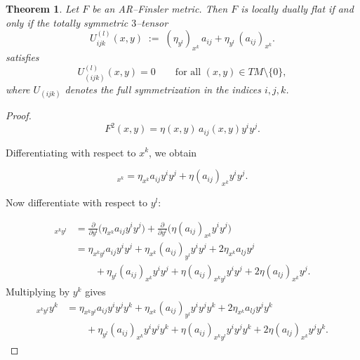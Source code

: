 \documentclass[12pt]{article}
\newtheorem{theorem}{Theorem}[section]
\theoremstyle{definition}
\begin{document}
					
					\begin{theorem}\label{thm:dually-flat-AR-equivalence}
						Let $F$ be an AR--Finsler metric.
						Then $F$ is locally dually flat if and
						only if the totally symmetric $3$--tensor
						\begin{equation}
						U^{(l)}_{ijk}(x,y) \;:=\; (\eta_{y^l})_{x^k}\,a_{ij} + \eta_{y^l}\,(a_{ij})_{x^k}.
						\end{equation}
						satisfies
						\begin{equation}
						U^{(l)}_{(ijk)}(x,y) = 0
						\qquad\text{for all }(x,y)\in TM\setminus\{0\},
						\end{equation}
						where $U_{(ijk)}$ denotes the full symmetrization in the indices $i,j,k$.
					\end{theorem}
					\begin{proof} 
						\begin{equation}
						F^2(x,y)=
						\eta(x,y)\,a_{ij}(x,y)y^iy^j.   
						\end{equation}
						
						Differentiating with respect to $x^k$, we obtain
						
						\begin{equation}
						[F^2]_{x^k}
						=
						\eta_{x^k}a_{ij}y^iy^j
						+
						\eta(a_{ij})_{x^k}y^iy^j.
						\end{equation}
						
						Now differentiate with respect to $y^l$:
						
						\begin{align}
							[F^2]_{x^ky^l}
							&=
							\frac{\partial}{\partial y^l}
							\Big(
							\eta_{x^k}a_{ij}y^iy^j
							\Big)
							+
							\frac{\partial}{\partial y^l}
							\Big(
							\eta(a_{ij})_{x^k}y^iy^j
							\Big)
							\nonumber\\
							&=
							\eta_{x^ky^l}a_{ij}y^iy^j
							+
							\eta_{x^k}(a_{ij})_{y^l}y^iy^j
							+
							2\eta_{x^k}a_{lj}y^j
							\nonumber\\
							&\qquad
							+
							\eta_{y^l}(a_{ij})_{x^k}y^iy^j
							+
							\eta(a_{ij})_{x^ky^l}y^iy^j
							+
							2\eta(a_{lj})_{x^k}y^j.
						\end{align}
						Multiplying by $y^k$ gives
						\begin{align}
							[F^2]_{x^ky^l}y^k
							&=
							\eta_{x^ky^l}a_{ij}y^iy^jy^k
							+
							\eta_{x^k}(a_{ij})_{y^l}y^iy^jy^k
							+
							2\eta_{x^k}a_{lj}y^jy^k
							\nonumber\\
							&\qquad
							+
							\eta_{y^l}(a_{ij})_{x^k}y^iy^jy^k
							+
							\eta(a_{ij})_{x^ky^l}y^iy^jy^k
							+
							2\eta(a_{lj})_{x^k}y^jy^k.
							\label{full}
						\end{align}
						

\end{proof}
\end{document}
